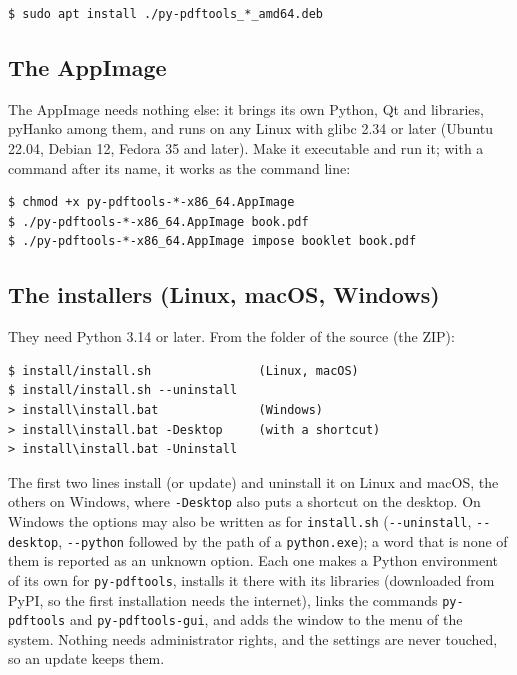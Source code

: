 \documentclass[12pt,
              article,
              oneside
              ]{memoir}
\begin{document}
\begin{verbatim}
$ sudo apt install ./py-pdftools_*_amd64.deb
\end{verbatim}

\subsection{The AppImage}

%
The AppImage needs nothing else: it brings its own Python, Qt and
libraries, pyHanko among them, and runs on any Linux with glibc 2.34 or
later (Ubuntu 22.04, Debian 12, Fedora 35 and later). Make it executable
and run it; with a command after its name, it works as the command line:

\begin{verbatim}
$ chmod +x py-pdftools-*-x86_64.AppImage
$ ./py-pdftools-*-x86_64.AppImage book.pdf
$ ./py-pdftools-*-x86_64.AppImage impose booklet book.pdf
\end{verbatim}

\subsection{The installers (Linux, macOS, Windows)}

They need Python 3.14 or later. From the folder of the source (the ZIP):

\begin{verbatim}
$ install/install.sh               (Linux, macOS)
$ install/install.sh --uninstall
> install\install.bat              (Windows)
> install\install.bat -Desktop     (with a shortcut)
> install\install.bat -Uninstall
\end{verbatim}

\noindent{}%
The first two lines install (or update) and uninstall it on
Linux and macOS, the others on Windows, where \texttt{-Desktop} also puts
a shortcut on the desktop. On Windows the options may also be written as
for \texttt{install.sh} (\texttt{-{}-uninstall}, \texttt{-{}-desktop},
\texttt{-{}-python} followed by the path of a \texttt{python.exe}); a word
that is none of them is reported as an unknown option. Each one makes a Python environment of its own for
\texttt{py-pdftools}, installs it there with its libraries (downloaded from
PyPI, so the first installation needs the internet), links the commands
\texttt{py-pdftools} and \texttt{py-pdftools-gui}, and adds the window to
the menu of the system. Nothing needs administrator rights, and the
settings are never touched, so an update keeps them.
\end{document}

